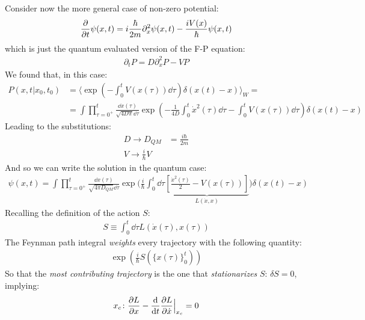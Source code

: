 \documentclass[../template.tex]{subfiles}
\begin{document}
Consider now the more general case of non-zero potential:
\begin{align*}
    \pdv{t} \psi(x,t) = i \frac{\hbar}{2m} \partial_x^2 \psi(x,t) - \frac{iV(x)}{\hbar} \psi(x,t)   
\end{align*}
which is just the quantum evaluated version of the F-P equation:
\begin{align*}
    \partial_t P = D \partial_x^2 P - VP
\end{align*}
We found that, in this case:
\begin{align*}
    P(x,t|x_0,t_0) &= \langle \exp\left(-\int_0^t V(x(\tau))\dd{\tau}\right) \delta(x(t)-x)\rangle_W = \\
    &= \int \prod_{\tau = 0^+}^t \frac{\dd{x(\tau)}}{\sqrt{4 D \pi} \dd{\tau}} \exp\left(-\frac{1}{4D} \int_0^t \dot{x}^2(\tau) \dd{\tau} - \int_0^t V(x(\tau))\dd{\tau} \right) \delta(x(t)-x)
\end{align*}
Leading to the substitutions:
\begin{align*}
    D \to D_{QM} &= \frac{i \hbar}{2m}\\
    V \to \frac{i}{\hbar}V  
\end{align*}
And so we can write the solution in the quantum case:
\begin{align*}
    \psi(x,t) = \int \prod_{\tau = 0^+}^t \frac{\dd{x(\tau)}}{\sqrt{4 \pi D_{QM}}\dd{\tau}}\exp\Big(\frac{i}{\hbar} \int_0^t \dd{\tau} \underbrace{\left[\frac{\dot{x}^2(\tau)}{2} - V(x(\tau)) \right]}_{L(\dot{x},x)}  \Big)  \delta(x(t)-x)
\end{align*}
Recalling the definition of the action $S$:
\begin{align*}
    S \equiv \int_0^t \dd{\tau} L(\dot{x}(\tau), x(\tau))
\end{align*} 
The Feynman path integral \textit{weights} every trajectory with the following quantity:
\begin{align*}
    \exp\left(\frac{i}{\hbar} S\left(\{x(\tau)\}_0^t\right) \right)
\end{align*} 
So that the \textit{most contributing trajectory} is the one that \textit{stationarizes} $S$: $\delta S = 0$, implying:
\begin{align*}
    x_c \colon 
    \pdv{L}{x} - \dv{t} \pdv{L}{\dot{x}} \Big|_{x_c} = 0
\end{align*}     
\end{document}
